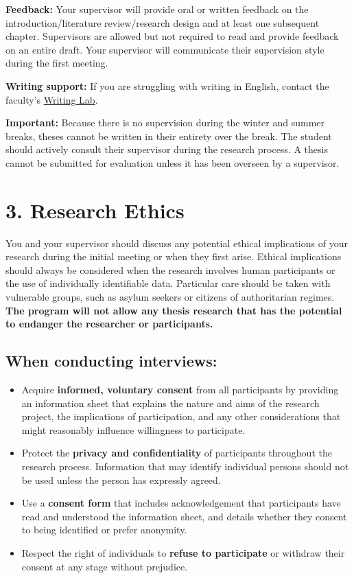 \documentclass[11pt,a4paper]{article}
\begin{document}
\textbf{Feedback:} Your supervisor will provide oral or written feedback on the introduction/literature review/research design and at least one subsequent chapter. Supervisors are allowed but not required to read and provide feedback on an entire draft. Your supervisor will communicate their supervision style during the first meeting.

\textbf{Writing support:} If you are struggling with writing in English, contact the faculty's \href{https://www.student.universiteitleiden.nl/en/vr/humanities/writing-lab}{Writing Lab}.

\textbf{Important:} Because there is no supervision during the winter and summer breaks, theses cannot be written in their entirety over the break. The student should actively consult their supervisor during the research process. A thesis cannot be submitted for evaluation unless it has been overseen by a supervisor.

\section{3. Research Ethics}

You and your supervisor should discuss any potential ethical implications of your research during the initial meeting or when they first arise. Ethical implications should always be considered when the research involves human participants or the use of individually identifiable data. Particular care should be taken with vulnerable groups, such as asylum seekers or citizens of authoritarian regimes. \textbf{The program will not allow any thesis research that has the potential to endanger the researcher or participants.}

\subsection{When conducting interviews:}

\begin{itemize}
    \item Acquire \textbf{informed, voluntary consent} from all participants by providing an information sheet that explains the nature and aims of the research project, the implications of participation, and any other considerations that might reasonably influence willingness to participate.
    \item Protect the \textbf{privacy and confidentiality} of participants throughout the research process. Information that may identify individual persons should not be used unless the person has expressly agreed.
    \item Use a \textbf{consent form} that includes acknowledgement that participants have read and understood the information sheet, and details whether they consent to being identified or prefer anonymity.
    \item Respect the right of individuals to \textbf{refuse to participate} or withdraw their consent at any stage without prejudice.
\end{itemize}
\end{document}
